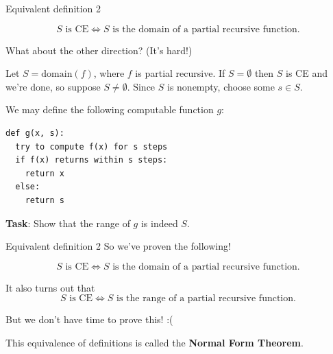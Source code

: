 \documentclass{beamer}
\begin{document}
\begin{frame}[fragile]{Equivalent definition 2}

$$\text{$S$ is CE} \Leftrightarrow \text{$S$ is the domain of a partial recursive function}.$$

What about the other direction? (It's hard!)

\pause

Let $S = \text{domain}(f)$, where $f$ is partial recursive. If $S = \emptyset$ then $S$ is CE and we're done, so suppose $S \neq \emptyset$. Since $S$ is nonempty, choose some $s \in S$.

We may define the following computable function $g$:
\begin{verbatim}
def g(x, s):
  try to compute f(x) for s steps
  if f(x) returns within s steps:
    return x
  else: 
    return s
\end{verbatim}

\textbf{Task}: Show that the range of $g$ is indeed $S$.

\end{frame}

\begin{frame}[fragile]{Equivalent definition 2}
So we've proven the following!

$$\text{$S$ is CE} \Leftrightarrow \text{$S$ is the domain of a partial recursive function}.$$

\pause

It also turns out that 
$$\text{$S$ is CE} \Leftrightarrow \text{$S$ is the range of a partial recursive function}.$$

But we don't have time to prove this! :(
\pause

This equivalence of definitions is called the \textbf{Normal Form Theorem}.

\end{frame}
\end{document}
